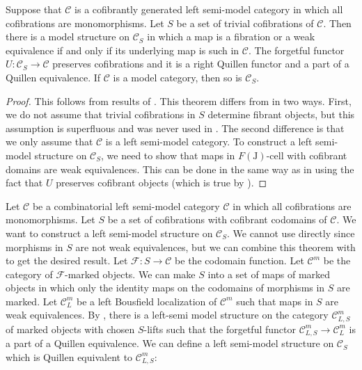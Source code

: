 \documentclass[reqno]{amsart}
\theoremstyle{definition}
\theoremstyle{remark}
\newcommand{\fs}[1]{\mathrm{#1}}
\newcommand{\cat}[1]{\mathcal{#1}}
\newcommand{\C}{\cat{C}}
\newcommand{\I}{\fs{I}}
\newcommand{\J}{\fs{J}}
\newcommand{\class}[2]{#1\text{-}\mathrm{#2}}
\newcommand{\Icell}[1][\I]{\class{#1}{cell}}
\numberwithin{figure}{section}
\begin{document}
\begin{thm}
Suppose that $\C$ is a cofibrantly generated left semi-model category in which all cofibrations are monomorphisms.
Let $S$ be a set of trivial cofibrations of $\C$.
Then there is a model structure on $\C_S$ in which a map is a fibration or a weak equivalence if and only if its underlying map is such in $\C$.
The forgetful functor $U : \C_S \to \C$ preserves cofibrations and it is a right Quillen functor and a part of a Quillen equivalence.
If $\C$ is a model category, then so is $\C_S$.
\end{thm}
\begin{proof}
This follows from results of \cite{algebraic-fibrant-objects}.
This theorem differs from \cite[Theorem~2.20]{algebraic-fibrant-objects} in two ways.
First, we do not assume that trivial cofibrations in $S$ determine fibrant objects, but this assumption is superfluous and was never used in \cite{algebraic-fibrant-objects}.
The second difference is that we only assume that $\C$ is a left semi-model category.
To construct a left semi-model structure on $\C_S$, we need to show that maps in $\Icell[F(\J)]$ with cofibrant domains are weak equivalences.
This can be done in the same way as in \cite[Theorem~2.20]{algebraic-fibrant-objects} using the fact that $U$ preserves cofibrant objects (which is true by \cite[Corollary~2.18]{algebraic-fibrant-objects}).
\end{proof}

Let $\C$ be a combinatorial left semi-model category $\C$ in which all cofibrations are monomorphisms.
Let $S$ be a set of cofibrations with cofibrant codomains of $\C$.
We want to construct a left semi-model structure on $\C_S$.
We cannot use  directly since morphisms in $S$ are not weak equivalences, but we can combine this theorem with  to get the desired result.
Let $\mathcal{F} : S \to \C$ be the codomain function.
Let $\C^m$ be the category of $\mathcal{F}$-marked objects.
We can make $S$ into a set of maps of marked objects in which only the identity maps on the codomains of morphisms in $S$ are marked.
Let $\C^m_L$ be a left Bousfield localization of $\C^m$ such that maps in $S$ are weak equivalences.
By , there is a left-semi model structure on the category $\C^m_{L,S}$ of marked objects with chosen $S$-lifts such that the forgetful functor $\C^m_{L,S} \to \C^m_L$ is a part of a Quillen equivalence.
We can define a left semi-model structure on $\C_S$ which is Quillen equivalent to $\C^m_{L,S}$:
\end{document}
